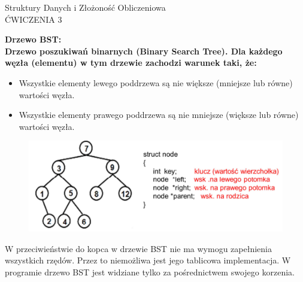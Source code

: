 \documentclass[a4paper,12pt]{article}
\newcommand{\h}[1]{\noindent \bf #1 \rm \\ \noindent}
\begin{document}
	
\begin{center}
	\LARGE
	Struktury Danych i Złożoność Obliczeniowa \\
	\large
	ĆWICZENIA 3 
\end{center}
\vspace{1cm}	

\h{Drzewo BST:}
Drzewo poszukiwań binarnych (Binary Search Tree). Dla każdego węzła (elementu) w tym drzewie zachodzi warunek taki, że:
\begin{itemize}
	\item Wszystkie elementy lewego poddrzewa są nie większe (mniejsze lub równe) wartości węzła.
	\item Wszystkie elementy prawego poddrzewa są nie mniejsze (większe lub równe) wartości węzła.
\end{itemize}
\vspace{5mm}

\begin{figure}[H]
	\centering
	\includegraphics[width=14cm]{fig1.png}
\end{figure}

\noindent
W przeciwieństwie do kopca w drzewie BST nie ma wymogu zapełnienia wszystkich rzędów. Przez to niemożliwa jest jego tablicowa implementacja. W programie drzewo BST jest widziane tylko za pośrednictwem swojego korzenia.\\
\end{document}
